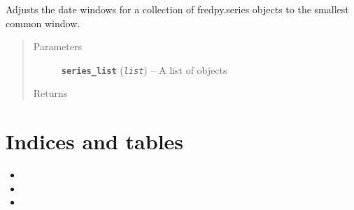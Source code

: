 \documentclass[letterpaper,10pt,english]{sphinxmanual}
\begin{document}

\begin{fulllineitems}
\label{additional_functions:fredpy.window_equalize}
Adjusts the date windows for a collection of fredpy.series objects to the smallest common window.
\begin{quote}\begin{description}
\item[{Parameters}] \leavevmode
\textbf{\texttt{series\_list}} (\emph{\texttt{list}}) -- A list of {\hyperref[series_class:fredpy.series]{}} objects

\item[{Returns}] \leavevmode


\end{description}\end{quote}

\end{fulllineitems}



\chapter{Indices and tables}
\label{index:indices-and-tables}\begin{itemize}
\item {} 

\item {} 

\item {} 

\end{itemize}



\renewcommand{\indexname}{Index}
\printindex
\end{document}
